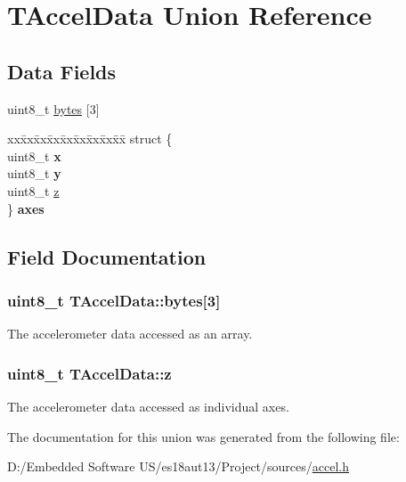\hypertarget{union_t_accel_data}{}\section{T\+Accel\+Data Union Reference}
\label{union_t_accel_data}
\subsection*{Data Fields}
\begin{DoxyCompactItemize}
\item 
uint8\+\_\+t \hyperlink{union_t_accel_data_a4ffa38e5b36a1a9fa7647f93594c5a4c}{bytes} \mbox{[}3\mbox{]}
\item 
\hypertarget{union_t_accel_data_a59404b4d7b3d670e2f3ddb65ec96a0c3}{}\begin{tabbing}
xx\=xx\=xx\=xx\=xx\=xx\=xx\=xx\=xx\=\kill
struct \{\\
\>uint8\_t {\bfseries x}\\
\>uint8\_t {\bfseries y}\\
\>uint8\_t \hyperlink{union_t_accel_data_ac9977c7ea7716448d89b8fa072c7c05d}{z}\\
\} {\bfseries axes}\label{union_t_accel_data_a59404b4d7b3d670e2f3ddb65ec96a0c3}
\\

\end{tabbing}\end{DoxyCompactItemize}


\subsection{Field Documentation}
\hypertarget{union_t_accel_data_a4ffa38e5b36a1a9fa7647f93594c5a4c}{}
\subsubsection[{bytes}]{\setlength{\rightskip}{0pt plus 5cm}uint8\+\_\+t T\+Accel\+Data\+::bytes\mbox{[}3\mbox{]}}\label{union_t_accel_data_a4ffa38e5b36a1a9fa7647f93594c5a4c}
The accelerometer data accessed as an array. \hypertarget{union_t_accel_data_ac9977c7ea7716448d89b8fa072c7c05d}{}
\subsubsection[{z}]{\setlength{\rightskip}{0pt plus 5cm}uint8\+\_\+t T\+Accel\+Data\+::z}\label{union_t_accel_data_ac9977c7ea7716448d89b8fa072c7c05d}
The accelerometer data accessed as individual axes. 

The documentation for this union was generated from the following file\+:\begin{DoxyCompactItemize}
\item 
D\+:/\+Embedded Software U\+S/es18aut13/\+Project/sources/\hyperlink{accel_8h}{accel.\+h}\end{DoxyCompactItemize}

